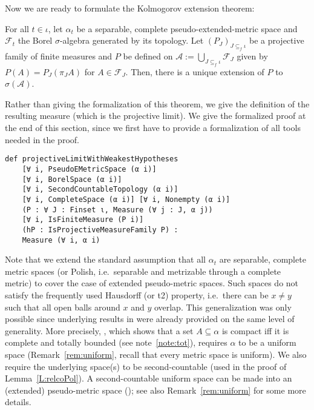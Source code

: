 \documentclass[lean]{DraftAFM}
\begin{document}
\noindent
Now we are ready to formulate the Kolmogorov extension theorem:

\begin{theorem}\label{T1}
  For all $t\in\iota$, let $\alpha_t$ be a separable, complete
  pseudo-extended-metric space and $\mathcal F_t$ the Borel
  $\sigma$-algebra generated by its topology. Let $(P_J)_{J\subseteq_f
    \iota}$ be a projective family of finite measures and $P$ be
  defined on $\mathcal A := \bigcup_{J \subseteq_f \iota} \mathcal
  F_J$ given by $P(A) = P_J(\pi_J A)$ for $A\in\mathcal F_J$. Then,
  there is a unique extension of $P$ to $\sigma(\mathcal A)$.
\end{theorem}

Rather than giving the formalization of this theorem, we give the
definition of the resulting measure (which is the projective
limit). We give the formalized proof at the end of this section, since
we first have to provide a formalization of all tools needed in the
proof.

\begin{verbatim}
def projectiveLimitWithWeakestHypotheses
    [∀ i, PseudoEMetricSpace (α i)]
    [∀ i, BorelSpace (α i)]
    [∀ i, SecondCountableTopology (α i)]
    [∀ i, CompleteSpace (α i)] [∀ i, Nonempty (α i)]
    (P : ∀ J : Finset ι, Measure (∀ j : J, α j))
    [∀ i, IsFiniteMeasure (P i)]
    (hP : IsProjectiveMeasureFamily P) :
    Measure (∀ i, α i)
\end{verbatim}

\noindent
Note that we extend the standard assumption that all $\alpha_t$ are
separable, complete metric spaces (or Polish, i.e.\ separable and
metrizable through a complete metric) to cover the case of extended
pseudo-metric spaces. Such spaces do not satisfy the frequently used
Hausdorff (or t2) property, i.e.\ there can be $x\neq y$ such that all
open balls around $x$ and $y$ overlap.  This generalization was only
possible since underlying results in  were already
provided on the same level of generality.  More precisely,
, which shows that a
set $A \subseteq \alpha$ is compact iff it is complete and totally
bounded (see note~\ref{note:tot}), requires $\alpha$ to be a uniform
space (Remark~\ref{rem:uniform}, recall that every metric space is
uniform).  We also require the underlying space(s) to be
second-countable (used in the proof of Lemma~\ref{L:relcoPol}).  A
second-countable uniform space can be made into an (extended)
pseudo-metric space ();
see also Remark~\ref{rem:uniform} for some more details.
\end{document}
